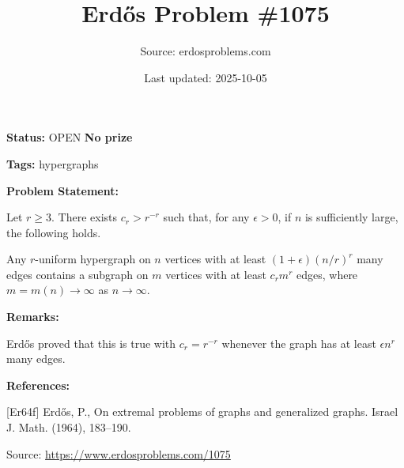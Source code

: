 \documentclass{article}
\title{Erd\H{o}s Problem \#1075}
\date{Last updated: 2025-10-05}
\author{Source: erdosproblems.com}
\begin{document}
\maketitle

\noindent\textbf{Status:} OPEN \quad \textbf{No prize}

\noindent\textbf{Tags:} hypergraphs

\medskip
\noindent\textbf{Problem Statement:}

Let $r\geq 3$. There exists $c_r>r^{-r}$ such that, for any $\epsilon>0$, if $n$ is sufficiently large, the following holds.

Any $r$-uniform hypergraph on $n$ vertices with at least $(1+\epsilon)(n/r)^r$ many edges contains a subgraph on $m$ vertices with at least $c_rm^r$ edges, where $m=m(n)\to \infty$ as $n\to \infty$.

\bigskip
\noindent\textbf{Remarks:}

Erd\H{o}s \cite{Er64f} proved that this is true with $c_r=r^{-r}$ whenever the graph has at least $\epsilon n^r$ many edges.

\bigskip
\noindent\textbf{References:}

[Er64f] Erd\H{o}s, P., On extremal problems of graphs and generalized graphs. Israel J. Math. (1964), 183--190.

\bigskip
\noindent\small{Source: \url{https://www.erdosproblems.com/1075}}
\end{document}
